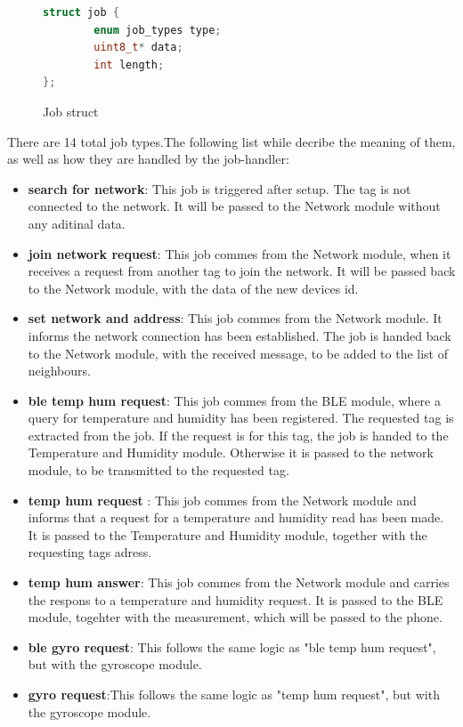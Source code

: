 \begin{figure}[h]
    \centering
    \begin{lstlisting}[language=c]
    struct job {
  		enum job_types type;
  		uint8_t* data;
  		int length;
};
    \end{lstlisting}
    \caption{Job struct}
	\label{code:job_struct}
\end{figure}

There are 14 total job types.The following list while decribe the meaning of them, as well as how they are handled by the job-handler:
\begin{itemize}
  \item \textbf{search for network}: This job is triggered after setup. The tag is not connected to the network. It will be passed to the Network module without any aditinal data.
  \item \textbf{join network request}: This job commes from the Network module, when it receives a request from another tag to join the network. It will be passed back to the Network module, with the data of the new devices id.
  \item \textbf{set network and address}: This job commes from the Network module. It informs the network connection has been established. The job is handed back to the Network module, with the received message, to be added to the list of neighbours.
  \item \textbf{ble temp hum request}: This job commes from the BLE module, where a query for temperature and humidity has been registered. The requested tag is extracted from the job. If the request is for this tag, the job is handed to the Temperature and Humidity module. Otherwise it is passed to the network module, to be transmitted to the requested tag.
  \item \textbf{temp hum request }: This job commes from the Network module and informs that a request for a temperature and humidity read has been made. It is passed to the Temperature and Humidity module, together with the requesting tags adress.
  \item \textbf{temp hum answer}: This job commes from the Network module and carries the respons to a temperature and humidity request. It is passed to the BLE module, togehter with the measurement, which will be passed to the phone.
  \item \textbf{ble gyro request}: This follows the same logic as "ble temp hum request", but with the gyroscope module.
  \item \textbf{gyro request}:This follows the same logic as "temp hum request", but with the gyroscope module.

\end{itemize}
